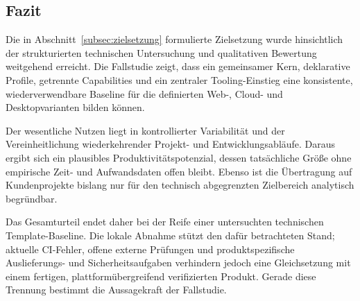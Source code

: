\subsection{Fazit}
\label{subsec:fazit}

Die in Abschnitt~\ref{subsec:zielsetzung} formulierte Zielsetzung wurde
hinsichtlich der strukturierten technischen Untersuchung und qualitativen
Bewertung weitgehend erreicht. Die Fallstudie zeigt, dass ein gemeinsamer
Kern, deklarative Profile, getrennte Capabilities und ein zentraler
Tooling-Einstieg eine konsistente, wiederverwendbare Baseline für die
definierten Web-, Cloud- und Desktopvarianten bilden können.

Der wesentliche Nutzen liegt in kontrollierter Variabilität und der
Vereinheitlichung wiederkehrender Projekt- und Entwicklungsabläufe. Daraus
ergibt sich ein plausibles Produktivitätspotenzial, dessen tatsächliche Größe
ohne empirische Zeit- und Aufwandsdaten offen bleibt. Ebenso ist die
Übertragung auf Kundenprojekte bislang nur für den technisch abgegrenzten
Zielbereich analytisch begründbar.

Das Gesamturteil endet daher bei der Reife einer untersuchten technischen
Template-Baseline. Die lokale Abnahme stützt den dafür betrachteten Stand;
aktuelle CI-Fehler, offene externe Prüfungen und produktspezifische
Auslieferungs- und Sicherheitsaufgaben verhindern jedoch eine Gleichsetzung
mit einem fertigen, plattformübergreifend verifizierten Produkt. Gerade diese
Trennung bestimmt die Aussagekraft der Fallstudie.
